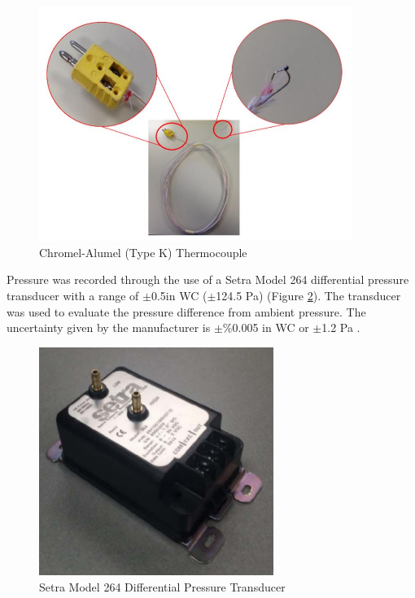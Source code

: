 \documentclass{article}
\begin{document}
\begin{figure} [H]
	\centering
	\includegraphics[width = 4in]{0_Images/Instrumentation/Thermocouple.jpg}
	\caption{Chromel-Alumel (Type K) Thermocouple}
	\label{fig:Thermocouple}
\end{figure}

Pressure was recorded through the use of a Setra Model 264 differential pressure transducer with a range of $\pm$0.5in WC ($\pm$124.5 Pa) (Figure \ref{fig:Setra}). The transducer was used to evaluate the pressure difference from ambient pressure. The uncertainty given by the manufacturer is $\pm$\%0.005 in WC or $\pm$1.2 Pa \cite{SetraManual}.

\begin{figure} [H]
	\centering
	\includegraphics[width = 3in]{0_Images/Instrumentation/Setra.jpg}
	\caption{Setra Model 264 Differential Pressure Transducer}
	\label{fig:Setra}
\end{figure}
\end{document}
